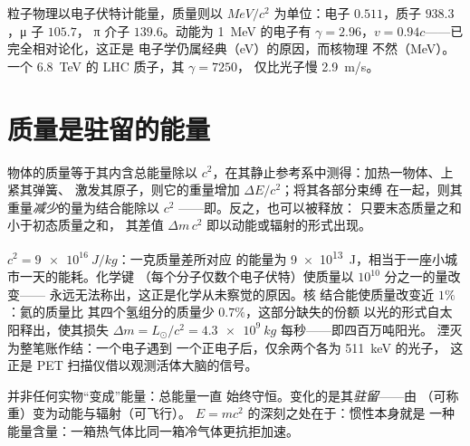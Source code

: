 \begin{example}[数量级]\label{ex:b3:relativistic-dynamics:orders}
粒子物理以电子伏特计能量，质量则以
$\unit{MeV}/c^2$ 为单位：电子 $0.511$，质子 $938.3$，μ 子 $105.7$，
π 介子 $139.6$。动能为 \qty{1}{MeV} 的电子有 $\gamma =
2.96$，$v = 0.94c$——已完全相对论化，这正是
电子学仍属经典（\unit{eV}）的原因，而核物理
不然（\unit{MeV}）。一个 \qty{6.8}{TeV} 的 LHC 质子，其 $\gamma = 7250$，
仅比光子慢 \qty{2.9}{m/s}。
\end{example}

\section{质量是驻留的能量}

\begin{theorem}[质能等价]\label{thm:b3:relativistic-dynamics:emc2}
物体的质量等于其内含总能量除以
$c^2$，在其静止参考系中测得：加热一物体、上紧其弹簧、
激发其原子，则它的重量增加 $\Delta E/c^2$；将其各部分束缚
在一起，则其重量\emph{减少}的量为结合能除以 $c^2$
——即\emph{}。反之，也可以被释放：
只要末态质量之和小于初态质量之和，
其差值 $\Delta m\,c^2$ 即以动能或辐射的形式出现。
\end{theorem}
\admitted

\begin{example}[$c^2$ 的账目]\label{ex:b3:relativistic-dynamics:ledger}
$c^2 = \qty{9e16}{J/kg}$：一克质量差所对应
的能量为 \qty{9e13}{J}，相当于一座小城市一天的能耗。化学键
（每个分子仅数个电子伏特）使质量以 $10^{10}$ 分之一的量改变——
永远无法称出，这正是化学从未察觉的原因。核
结合能使质量改变近 $1\%$：氦的质量比
其四个氢组分的质量少 $0.7\%$，这部分缺失的份额
以光的形式自太阳释出，使其损失 $\Delta m = L_\odot/c^2 =
\qty{4.3e9}{kg}$ 每秒——即四百万吨阳光。
湮灭为整笔账作结：一个电子遇到
一个正电子后，仅余两个各为 \qty{511}{keV} 的光子，
这正是 PET 扫描仪借以观测活体大脑的信号。
\end{example}

\begin{remark}[“转化”的含义]\label{rem:b3:relativistic-dynamics:conversion}
并非任何实物“变成”能量：总能量一直
始终守恒。变化的是其\emph{驻留}——由
（可称重）变为动能与辐射（可飞行）。
$E = mc^2$ 的深刻之处在于：惯性本身就是
一种能量含量：一箱热气体比同一箱冷气体更抗拒加速。
\end{remark}

